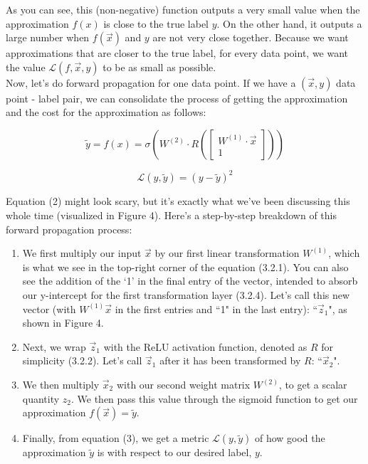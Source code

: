 \documentclass{article}
\begin{document}
As you can see, this (non-negative) function outputs a very small value when the approximation $f(x)$ is close to the true label $y$. On the other hand, it outputs a large number when $f(\vec{x})$ and $y$ are not very close together. Because we want approximations that are closer to the true label, for every data point, we want the value $\mathcal{L}(f, \vec{x}, y)$ to be as small as possible. \\

Now, let's do forward propagation for one data point. If we have a $(\vec{x}, y)$ data point - label pair, we can consolidate the process of getting the approximation and the cost for the approximation as follows:

\begin{equation}
\tilde{y} = f(x) = 
\sigma\left(W^{(2)} \cdot R\left(\begin{bmatrix} W^{(1)} \cdot \vec{x} \\ 1\end{bmatrix}\right)\right)
\end{equation}

\begin{equation}
\mathcal{L}\left(y, \tilde{y}\right) = \left(y - \tilde{y}\right)^{2}
\end{equation}

Equation (2) might look scary, but it's exactly what we've been discussing this whole time (visualized in Figure 4). Here's a step-by-step breakdown of this forward propagation process: 

\begin{enumerate}
    \item

    We first multiply our input $\vec{x}$ by our first linear transformation $W^{(1)}$, which is what we see in the top-right corner of the equation (3.2.1). You can also see the addition of the `1' in the final entry of the vector, intended to absorb our y-intercept for the first transformation layer (3.2.4). Let's call this new vector (with $W^{(1)}\vec{x}$ in the first entries and ``1" in the last entry): ``$\vec{z}_1$", as shown in Figure 4. 
    
    \item

    Next, we wrap $\vec{z}_1$ with the ReLU activation function, denoted as $R$ for simplicity (3.2.2). Let's call $\vec{z}_1$ after it has been transformed by $R$: ``$\vec{x}_2$".
    
    \item

    We then multiply $\vec{x}_2$ with our second weight matrix $W^{(2)}$, to get a scalar quantity $z_2$. We then pass this value through the sigmoid function to get our approximation $f\left(\vec{x}\right) = \tilde{y}$.

    \item

    Finally, from equation (3), we get a metric $\mathcal{L}(y, \tilde{y})$ of how good the approximation $\tilde{y}$ is with respect to our desired label, $y$.  
    
\end{enumerate}
\end{document}
